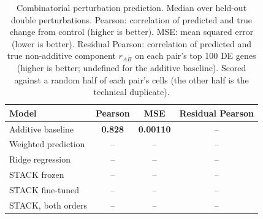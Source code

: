 \begin{table}[t]
    \caption{Combinatorial perturbation prediction. Median over held-out double
    perturbations. Pearson: correlation of predicted and true change from control
    (higher is better). MSE: mean squared error (lower is better). Residual Pearson:
    correlation of predicted and true non-additive component $r_{AB}$ on each pair's
    top 100 DE genes (higher is better; undefined for the additive baseline).
    Scored against a random half of each pair's cells (the other half is the technical duplicate).}
    \label{tab:composition_results}
    \centering
    \begin{tabular}{lccc}
        \toprule
        Model & Pearson & MSE & Residual Pearson \\
        \midrule
        Additive baseline     & \textbf{0.828} & \textbf{0.00110} & -- \\
        Weighted prediction   & -- & -- & -- \\
        Ridge regression      & -- & -- & -- \\
        STACK frozen          & -- & -- & -- \\
        STACK fine-tuned      & -- & -- & -- \\
        STACK, both orders    & -- & -- & -- \\
        \bottomrule
    \end{tabular}
\end{table}
